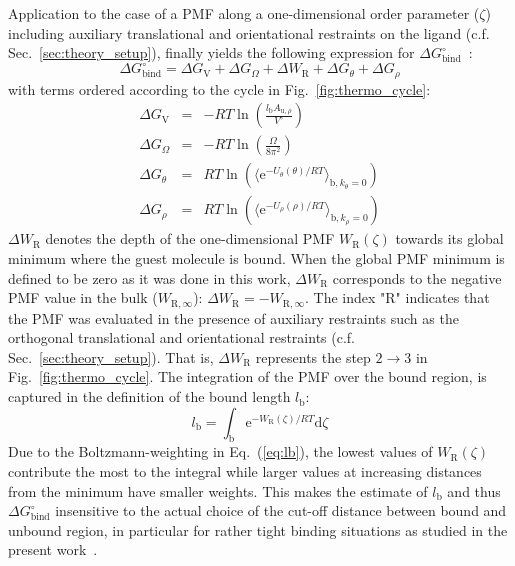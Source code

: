 \documentclass[9pt,lessons]{livecoms}
\begin{document}
Application to the case of a PMF along a one-dimensional order parameter ($\zeta$) including auxiliary translational and orientational restraints on the ligand (c.f. Sec.~\ref{sec:theory_setup}), 
finally yields the following expression for $\Delta G^\circ_\mathrm{bind}$~\cite{markthaler2017molecular, doudou2009standard}: 
\begin{equation}
\Delta G^\circ_\mathrm{bind} = \Delta G_\mathrm{V} + \Delta G_\Omega + \Delta W_\mathrm{R} + \Delta G_\theta + \Delta G_\rho
\label{eq:DG0_2}
\end{equation}
%
with terms ordered according to the cycle in Fig.~\ref{fig:thermo_cycle}:
\begin{eqnarray*}
\Delta G_\mathrm{V} & = &  - RT \ln\left(\frac{l_\mathrm{b} A_{\mathrm{u},\rho}}{V^\circ}\right) \\
\Delta G_\Omega & = & - RT \ln\left(\frac{\Omega}{8 \pi^2}\right) \\
\Delta G_\theta & = & RT \ln\left(\langle  \mathrm{e}^{- U_\theta(\theta)/RT}  \rangle_{\mathrm{b}, k_\theta=0}\right) \\
\Delta G_\rho & = & RT \ln\left(\langle  \mathrm{e}^{- U_\rho(\rho)/RT}  \rangle_{\mathrm{b}, k_\rho=0}\right)
\end{eqnarray*}
$\Delta W_\mathrm{R}$ denotes the depth of the one-dimensional PMF $W_\mathrm{R}(\zeta)$ towards its global minimum where the guest molecule is bound.
When the global PMF minimum is defined to be zero as it was done in this work, $\Delta W_\mathrm{R}$ corresponds to the negative PMF value in the bulk ($W_{\mathrm{R},\infty}$): 
$\Delta W_\mathrm{R} = - W_{\mathrm{R},\infty}$.
The index "R" indicates that the PMF was evaluated in the presence of auxiliary restraints such as the orthogonal translational and orientational restraints (c.f. Sec.~\ref{sec:theory_setup}).
That is, $\Delta W_\mathrm{R}$ represents the step $2 \rightarrow 3$ in Fig.~\ref{fig:thermo_cycle}.
The integration of the PMF over the bound region, is captured in the definition of the bound length $l_\mathrm{b}$:
\begin{equation}
	l_\mathrm{b} = \int_\mathrm{b}{ \mathrm{e}^{- W_\mathrm{R}(\zeta)/RT} \mathrm{d} \zeta }
\label{eq:lb}
\end{equation}
Due to the Boltzmann-weighting in Eq.~(\ref{eq:lb}), the lowest values of $W_\mathrm{R}(\zeta)$ contribute the most to the integral while larger values at increasing distances from the minimum have smaller weights.
This makes the estimate of $l_\mathrm{b}$ and thus $\Delta G^\circ_\mathrm{bind}$ insensitive to the actual choice of the cut-off distance between bound and unbound region, in particular for rather tight binding situations as studied in the present work~\cite{gilson1997statistical}.
\end{document}
